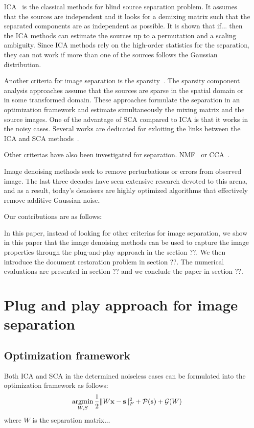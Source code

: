 \documentclass[conference]{IEEEtran}
\newcommand{\argmin}{\mathop{\mathrm{argmin}}}
\theoremstyle{plain}
\begin{document}
ICA~\cite{hyvarinen2004independent} is the classical methods for blind source separation problem. It assumes that the sources are independent and it looks for a demixing matrix such that the separated components are as independent as possible. It is shown that if... then the ICA methods can estimate the sources up to a permutation and a scaling ambiguity. Since ICA methods rely on the high-order statistics for the separation, they can not work if more than one of the sources follows the Gaussian distribution.

Another criteria for image separation is the sparsity~\cite{souidene2007blind, zibulevsky2001blind,bobin2007sparsity}. The sparsity component analysis approaches assume that the sources are sparse in the spatial domain or in some transformed domain. These approaches formulate the separation in an optimization framework and estimate simultaneously the mixing matrix and the source images. One of the advantage of SCA compared to ICA is that it works in the noisy cases. Several works are dedicated for exloiting the links between the ICA and SCA methods~\cite{feng2018revisiting}.

Other criterias have also been investigated for separation. NMF~\cite{merrikh2010using} or CCA~\cite{boccuto2019blind}.

Image denoising methods seek to remove perturbations or errors from observed image. The last three decades have seen extensive research devoted to this arena, and as a result, today's denoisers are highly optimized algorithms that effectively remove additive Gaussian noise. 

Our contributions are as follows:

In this paper, instead of looking for other criterias for image separation, we show in this paper that the image denoising methods can be used to capture the image properties through the plug-and-play approach in the section ??. We then introduce the document restoration problem in section ??. The numerical evaluations are presented in section ?? and we conclude the paper in section ??.  


\section{Plug and play approach for image separation}
\label{sec: plug and play}

\subsection{Optimization framework}
Both ICA and SCA in the determined noiseless cases can be formulated into the optimization framework as follows:
\begin{equation}
\label{eq: optimization framework}
\argmin_{W, S} \frac{1}{2} \|W\bx - \bs\|_F^2 + \mathcal{P}(\bs) + \mathcal{G}(W)
\end{equation}
where $W$ is the separation matrix... 
\end{document}
